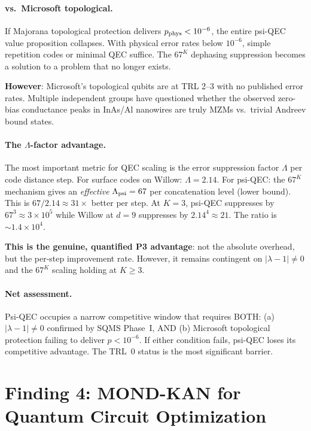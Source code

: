 \documentclass[11pt]{article}
\theoremstyle{definition}
\theoremstyle{remark}
\newcommand{\ee}[1]{\times 10^{#1}}
\newcommand{\lamdiff}{|\lambda-1|}
\begin{document}
\paragraph{vs.\ Microsoft topological.}
If Majorana topological protection delivers $p_{\rm phys} < 10^{-6}$, the
entire psi-QEC value proposition collapses.  With physical error rates below
$10^{-6}$, simple repetition codes or minimal QEC suffice.  The $67^K$
dephasing suppression becomes a solution to a problem that no longer exists.

\textbf{However}: Microsoft's topological qubits are at TRL 2--3 with
no published error rates.  Multiple independent groups have questioned
whether the observed zero-bias conductance peaks in InAs/Al nanowires are
truly MZMs vs.\ trivial Andreev bound states.

\paragraph{The $\Lambda$-factor advantage.}
The most important metric for QEC scaling is the error suppression factor
$\Lambda$ per code distance step.  For surface codes on Willow: $\Lambda = 2.14$.
For psi-QEC: the $67^K$ mechanism gives an \emph{effective}
$\Lambda_{\rm psi} = 67$ per concatenation level (lower bound).
This is $67/2.14 \approx 31\times$ better per step.  At $K=3$, psi-QEC
suppresses by $67^3 \approx 3\ee{5}$ while Willow at $d=9$ suppresses by
$2.14^4 \approx 21$.  The ratio is $\sim 1.4\ee{4}$.

\textbf{This is the genuine, quantified P3 advantage}: not the absolute
overhead, but the per-step improvement rate.  However, it remains contingent
on $\lamdiff \neq 0$ and the $67^K$ scaling holding at $K \geq 3$.

\paragraph{Net assessment.}
Psi-QEC occupies a narrow competitive window that requires BOTH:
(a) $\lamdiff \neq 0$ confirmed by SQMS Phase~I, AND (b) Microsoft
topological protection failing to deliver $p < 10^{-6}$.  If either
condition fails, psi-QEC loses its competitive advantage.  The TRL~0
status is the most significant barrier.

\section{Finding 4: MOND-KAN for Quantum Circuit Optimization}
\label{sec:mond-kan}
\end{document}
